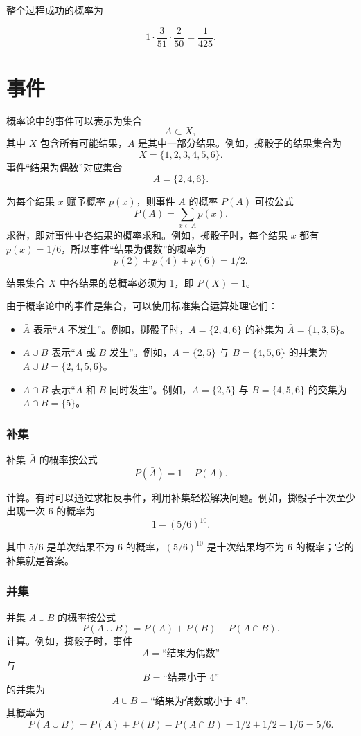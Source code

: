 整个过程成功的概率为

\[1 \cdot \frac{3}{51} \cdot \frac{2}{50} = \frac{1}{425}.\]

\section{事件}

概率论中的事件可以表示为集合
\[A \subset X,\]
其中 $X$ 包含所有可能结果，$A$ 是其中一部分结果。例如，掷骰子的结果集合为
\[X = \{1,2,3,4,5,6\}.\]
事件“结果为偶数”对应集合
\[A = \{2,4,6\}.\]

为每个结果 $x$ 赋予概率 $p(x)$，则事件 $A$ 的概率 $P(A)$ 可按公式
\[P(A) = \sum_{x \in A} p(x).\]
求得，即对事件中各结果的概率求和。例如，掷骰子时，每个结果 $x$ 都有 $p(x)=1/6$，所以事件“结果为偶数”的概率为
\[p(2)+p(4)+p(6)=1/2.\]

结果集合 $X$ 中各结果的总概率必须为 1，即 $P(X)=1$。

由于概率论中的事件是集合，可以使用标准集合运算处理它们：

\begin{itemize}
\item {} $\bar A$ 表示“$A$ 不发生”。例如，掷骰子时，$A=\{2,4,6\}$ 的补集为 $\bar A = \{1,3,5\}$。
\item {} $A \cup B$ 表示“$A$ 或 $B$ 发生”。例如，$A=\{2,5\}$ 与 $B=\{4,5,6\}$ 的并集为 $A \cup B = \{2,4,5,6\}$。
\item {} $A \cap B$ 表示“$A$ 和 $B$ 同时发生”。例如，$A=\{2,5\}$ 与 $B=\{4,5,6\}$ 的交集为 $A \cap B = \{5\}$。
\end{itemize}

\subsubsection{补集}

补集 $\bar A$ 的概率按公式
\[P(\bar A)=1-P(A).\]

计算。有时可以通过求相反事件，利用补集轻松解决问题。例如，掷骰子十次至少出现一次 6 的概率为
\[1-(5/6)^{10}.\]

其中 $5/6$ 是单次结果不为 6 的概率，$(5/6)^{10}$ 是十次结果均不为 6 的概率；它的补集就是答案。

\subsubsection{并集}

并集 $A \cup B$ 的概率按公式
\[P(A \cup B)=P(A)+P(B)-P(A \cap B).\]
计算。例如，掷骰子时，事件
\[A=\textrm{“结果为偶数”}\]
与
\[B=\textrm{“结果小于 4”}\]
的并集为
\[A \cup B=\textrm{“结果为偶数或小于 4”},\]
其概率为
\[P(A \cup B) = P(A)+P(B)-P(A \cap B)=1/2+1/2-1/6=5/6.\]

